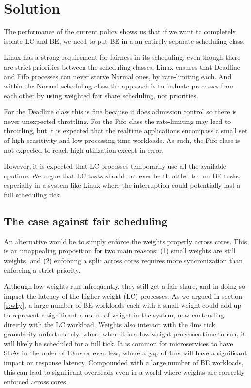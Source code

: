 \section{Solution}\label{s:solution}


The performance of the current \schedidle{} policy shows us that if we want to
completely isolate LC and BE, we need to put BE in a an entirely separate
scheduling class.

Linux has a strong requirement for fairness in its scheduling: even though there
are strict priorities between the scheduling classes, Linux ensures that
Deadline and Fifo processes can never starve Normal ones, by rate-limiting each.
And within the Normal scheduling class the approach is to insluate processes
from each other by using weighted fair share scheduling, not priorities.

For the Deadline class this is fine because it does admission control so there
is never unexpected throttling. For the Fifo class the rate-limiting may lead to
throttling, but it is expected that the realtime applications encompass a small
set of high-sensitivity and low-processing-time workloads. As such, the Fifo
class is not expected to reach high utilization except in error.

However, it is expected that LC processes temporarily use all the
available cputime. We argue that LC tasks should not ever be throttled to run BE
tasks, especially in a system like Linux where the interruption could
potentially last a full scheduling tick. 


\subsection{The case against fair scheduling}


An alternative would be to simply enforce the weights properly across cores.
This is an unappealing proposition for two main reasons: (1) small weights are
still weights, and (2) enforcing a split across cores requires more
syncronization than enforcing a strict priority.

Although low weights run infrequently, they still get a fair share, and in doing
so impact the latency of the higher weight (LC) processes. As we argued in
section \autoref{s:why}, a large number of BE workloads each with a small weight
could add up to represent a significant amount of weight in the system, now
contending directly with the LC workload. Weights also interact with the 4ms
tick granularity unfortunately, where when it is a low-weight processes time to
run, it will likely be scheduled for a full tick. It is common for microservices
to have SLAs in the order of 10ms or even less, where a gap of 4ms will have a
significant impact on response latency. Compounded with a large number of BE
workloads, this can lead to significant overheads even in a world where weights
are correctly enforced across cores.




